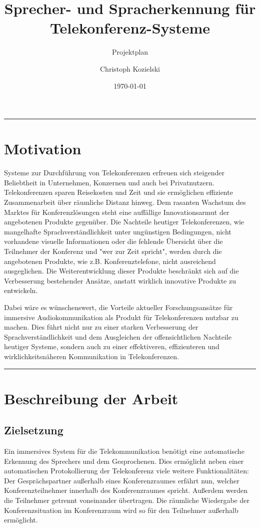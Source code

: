 \documentclass[lang=ngerman,inputenc=utf8,fontsize=10pt]{ldvarticle}
\title{Sprecher- und Spracherkennung für Telekonferenz-Systeme}
\subtitle{Projektplan}
\author{Christoph Kozielski}
\date{\today}
\begin{document}
	\maketitle
	\thispagestyle{empty}
	\vspace*{2cm}
	\hrule

\section*{Motivation}

Systeme zur Durchführung von Telekonferenzen erfreuen sich steigender Beliebtheit in Unternehmen, Konzernen und auch bei Privatnutzern. Telekonferenzen sparen Reisekosten und Zeit und sie ermöglichen effiziente Zusammenarbeit über räumliche Distanz hinweg. Dem rasanten Wachstum des Marktes für Konferenzlösungen steht eine auffällige Innovationsarmut der angebotenen Produkte gegenüber. Die Nachteile heutiger Telekonferenzen, wie mangelhafte Sprachverständlichkeit unter ungünstigen Bedingungen, nicht vorhandene visuelle Informationen oder die fehlende Übersicht über die Teilnehmer der Konferenz und "wer zur Zeit spricht", werden durch die angebotenen Produkte, wie z.B. Konferenztelefone, nicht ausreichend ausgeglichen. Die Weiterentwicklung dieser Produkte beschränkt sich auf die Verbesserung bestehender Ansätze, anstatt wirklich innovative Produkte zu entwickeln.

Dabei wäre es wünschenswert, die Vorteile aktueller Forschungsansätze für immersive Audiokommunikation als Produkt für Telekonferenzen nutzbar zu machen. Dies führt nicht nur zu einer starken Verbesserung der Sprachverständlichkeit und dem Ausgleichen der offensichtlichen Nachteile heutiger Systeme, sondern auch zu einer effektiveren, effizienteren und wirklichkeitsnäheren Kommunikation in Telekonferenzen.

\vspace*{1cm}
\hrule

\newpage

\section{Beschreibung der Arbeit}

\subsection*{Zielsetzung}

Ein immersives System für die Telekommunikation benötigt eine automatische Erkennung des Sprechers und dem Gesprochenen. Dies ermöglicht neben einer automatischen Protokollierung der Telekonferenz viele weitere Funktionalitäten: Der Gesprächspartner außerhalb eines Konferenzraumes erfährt nun, welcher Konferenzteilnehmer innerhalb des Konferenzraumes spricht. Außerdem werden die Teilnehmer getrennt voneinander übertragen. Die räumliche Wiedergabe der Konferenzsituation im Konferenzraum wird so für den Teilnehmer außerhalb ermöglicht.
\end{document}
